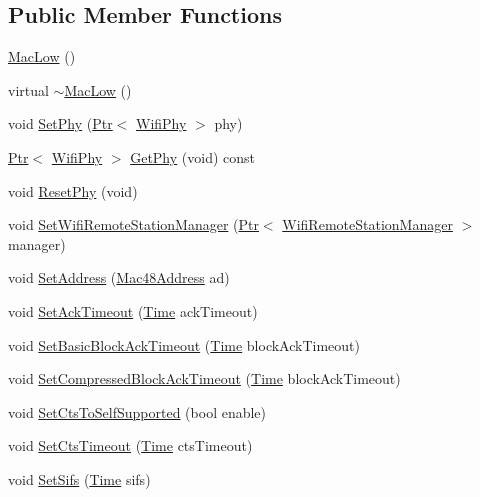 \subsection*{Public Member Functions}
\begin{DoxyCompactItemize}
\item 
\hyperlink{classns3_1_1MacLow_a7deab25806e5aef977c36151acb116c5}{Mac\+Low} ()
\item 
virtual \hyperlink{classns3_1_1MacLow_ac9e686b5f1c0ed26829b8eff1f8e60d2}{$\sim$\+Mac\+Low} ()
\item 
void \hyperlink{classns3_1_1MacLow_a1f2c6e12277422c081fa92f8edfe66e8}{Set\+Phy} (\hyperlink{classns3_1_1Ptr}{Ptr}$<$ \hyperlink{classns3_1_1WifiPhy}{Wifi\+Phy} $>$ phy)
\item 
\hyperlink{classns3_1_1Ptr}{Ptr}$<$ \hyperlink{classns3_1_1WifiPhy}{Wifi\+Phy} $>$ \hyperlink{classns3_1_1MacLow_a61da57dca75dee4cdd76f0950598ceb0}{Get\+Phy} (void) const 
\item 
void \hyperlink{classns3_1_1MacLow_a4158eb64f54ae53935769cdf0b12aafb}{Reset\+Phy} (void)
\item 
void \hyperlink{classns3_1_1MacLow_a8151fd0fa31a7034f86aa65b3e4973fa}{Set\+Wifi\+Remote\+Station\+Manager} (\hyperlink{classns3_1_1Ptr}{Ptr}$<$ \hyperlink{classns3_1_1WifiRemoteStationManager}{Wifi\+Remote\+Station\+Manager} $>$ manager)
\item 
void \hyperlink{classns3_1_1MacLow_a399290b378df4e041b9c4f7cc7b9b465}{Set\+Address} (\hyperlink{classns3_1_1Mac48Address}{Mac48\+Address} ad)
\item 
void \hyperlink{classns3_1_1MacLow_a602bb522f4cddf49eb8c577884c3fe31}{Set\+Ack\+Timeout} (\hyperlink{classns3_1_1Time}{Time} ack\+Timeout)
\item 
void \hyperlink{classns3_1_1MacLow_a3f9121a1c2608442164419550ffa8ea5}{Set\+Basic\+Block\+Ack\+Timeout} (\hyperlink{classns3_1_1Time}{Time} block\+Ack\+Timeout)
\item 
void \hyperlink{classns3_1_1MacLow_af756b3e62a77278698fb4fafc042b42b}{Set\+Compressed\+Block\+Ack\+Timeout} (\hyperlink{classns3_1_1Time}{Time} block\+Ack\+Timeout)
\item 
void \hyperlink{classns3_1_1MacLow_a5607ecee6bb1d6a26e1a373e85b2f3d3}{Set\+Cts\+To\+Self\+Supported} (bool enable)
\item 
void \hyperlink{classns3_1_1MacLow_a8f1a145762c6390aa236252dfa4dcd5f}{Set\+Cts\+Timeout} (\hyperlink{classns3_1_1Time}{Time} cts\+Timeout)
\item 
void \hyperlink{classns3_1_1MacLow_a105b29449995514e14ec554dfa499dbd}{Set\+Sifs} (\hyperlink{classns3_1_1Time}{Time} sifs)

\end{DoxyCompactItemize}
